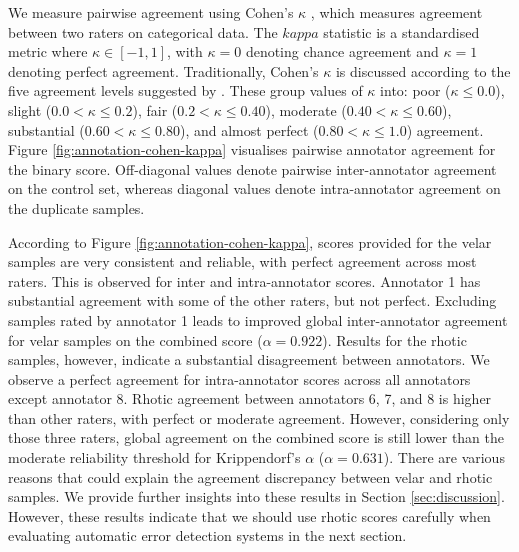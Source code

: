 We measure pairwise agreement using Cohen's $\kappa$ \citep{cohen1960coefficient}, which measures agreement between two raters on categorical data.
The $kappa$ statistic is a standardised metric where $\kappa \in [-1, 1]$, with $\kappa = 0$ denoting chance agreement and $\kappa=1$ denoting perfect agreement.
Traditionally, Cohen's $\kappa$ is discussed according to the five agreement levels suggested by \citet[pp 164-165]{landis1977measurement}.
These group values of $\kappa$ into: poor ($\kappa \leq 0.0$), slight ($0.0 < \kappa \leqslant 0.2$), fair ($0.2 < \kappa \leqslant 0.40$), moderate ($0.40 < \kappa \leqslant 0.60$), substantial ($0.60 < \kappa \leqslant 0.80$), and almost perfect ($0.80 < \kappa \leqslant 1.0$) agreement.
Figure \ref{fig:annotation-cohen-kappa} visualises pairwise annotator agreement for the binary score.
Off-diagonal values denote pairwise inter-annotator agreement on the control set, whereas diagonal values denote intra-annotator agreement on the duplicate samples.

According to Figure \ref{fig:annotation-cohen-kappa}, scores provided for the velar samples are very consistent and reliable, with perfect agreement across most raters.
This is observed for inter and intra-annotator scores.
Annotator 1 has substantial agreement with some of the other raters, but not perfect.
Excluding samples rated by annotator 1 leads to improved global inter-annotator agreement for velar samples on the combined score ($\alpha=0.922$).
Results for the rhotic samples, however, indicate a substantial disagreement between annotators.
We observe a perfect agreement for intra-annotator scores across all annotators except annotator 8.
Rhotic agreement between annotators 6, 7, and 8 is higher than other raters, with perfect or moderate agreement.
However, considering only those three raters, global agreement on the combined score is still lower than the moderate reliability threshold for Krippendorf's $\alpha$ ($\alpha=0.631$).
There are various reasons that could explain the agreement discrepancy between velar and rhotic samples.
We provide further insights into these results in Section \ref{sec:discussion}.
However, these results indicate that we should use rhotic scores carefully when evaluating automatic error detection systems in the next section.

